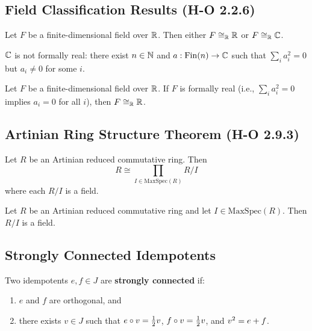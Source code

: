 \subsection{Field Classification Results (H-O 2.2.6)}

\begin{theorem}
Let $F$ be a finite-dimensional field over $\mathbb{R}$. Then either $F \cong_{\mathbb{R}} \mathbb{R}$ or $F \cong_{\mathbb{R}} \mathbb{C}$.
\end{theorem}

\begin{theorem}
$\mathbb{C}$ is not formally real: there exist $n \in \mathbb{N}$ and $a : \mathrm{Fin}(n) \to \mathbb{C}$ such that $\sum_i a_i^2 = 0$ but $a_i \ne 0$ for some $i$.
\end{theorem}

\begin{theorem}
Let $F$ be a finite-dimensional field over $\mathbb{R}$. If $F$ is formally real (i.e., $\sum_i a_i^2 = 0$ implies $a_i = 0$ for all $i$), then $F \cong_{\mathbb{R}} \mathbb{R}$.
\end{theorem}

\subsection{Artinian Ring Structure Theorem (H-O 2.9.3)}

\begin{definition}
Let $R$ be an Artinian reduced commutative ring. Then
\[ R \cong \prod_{I \in \mathrm{MaxSpec}(R)} R/I \]
where each $R/I$ is a field.
\end{definition}

\begin{proposition}
Let $R$ be an Artinian reduced commutative ring and let $I \in \mathrm{MaxSpec}(R)$. Then $R/I$ is a field.
\end{proposition}

\subsection{Strongly Connected Idempotents}

\begin{definition}[IsStronglyConnected]
Two idempotents $e, f \in J$ are \textbf{strongly connected} if:
\begin{enumerate}
  \item $e$ and $f$ are orthogonal, and
  \item there exists $v \in J$ such that $e \circ v = \frac{1}{2} v$, $f \circ v = \frac{1}{2} v$, and $v^{2} = e + f$.
\end{enumerate}
\end{definition}

